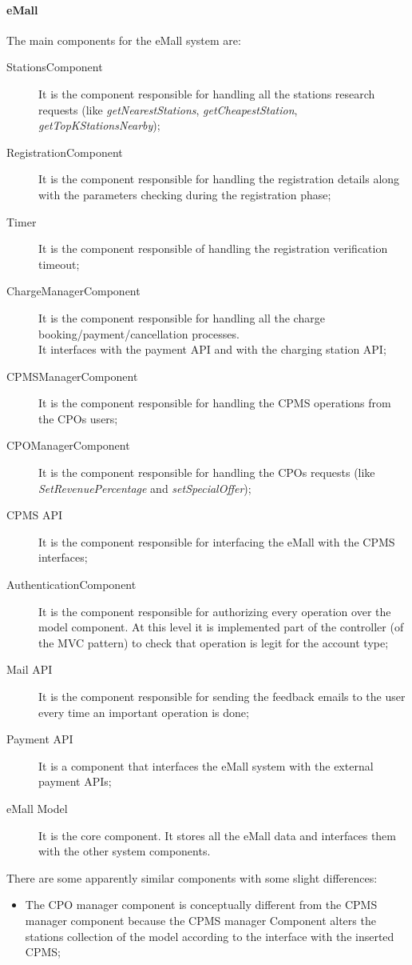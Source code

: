 \paragraph{\textbf{\ac{eMall}}}
The main components for the \ac{eMall} system are:
\begin{description}
    \item [\label{StationsComponent}StationsComponent] It is the component responsible for handling all the stations research requests (like \textit{getNearestStations}, \textit{getCheapestStation}, \textit{getTopKStationsNearby});
    \item [\label{RegistrationComponent}RegistrationComponent] It is the component responsible for handling the registration details along with the parameters checking during the registration phase;
    \item [\label{Timer}Timer] It is the component responsible of handling the registration verification timeout;
    \item [\label{ChargeManagerComponent}ChargeManagerComponent] It is the component responsible for handling all the charge booking/payment/cancellation processes. \\ It interfaces with the payment \ac{API} and with the charging station \ac{API};
    \item [\label{CPMSManagerComponent}CPMSManagerComponent] It is the component responsible for handling the \ac{CPMS} operations from the \acp{CPO} users;
    \item [\label{CPOManagerComponent}CPOManagerComponent] It is the component responsible for handling the \acp{CPO} requests (like \textit{SetRevenuePercentage} and \textit{setSpecialOffer});
    \item [\label{CPMSAPI}CPMS API] It is the component responsible for interfacing the \ac{eMall} with the CPMS interfaces;
    \item [\label{AuthenticationComponent}AuthenticationComponent] It is the component responsible for authorizing every operation over the model component. At this level it is implemented part of the controller (of the \ac{MVC} pattern) to check that operation is legit for the account type;
    \item [\label{MailAPI}Mail API] It is the component responsible for sending the feedback emails to the user every time an important operation is done;
    \item [\label{PaymentAPI}Payment API] It is a component that interfaces the \ac{eMall} system with the external payment \acp{API};
    \item [\label{eMallModel}eMall Model] It is the core component. It stores all the \ac{eMall} data and interfaces them with the other system components.
\end{description}
There are some apparently similar components with some slight differences:
\begin{itemize}
    \item The \ac{CPO} manager component is conceptually different from the \ac{CPMS} manager component because the CPMS manager Component alters the stations collection of the model according to the interface with the inserted \ac{CPMS};
\end{itemize}
